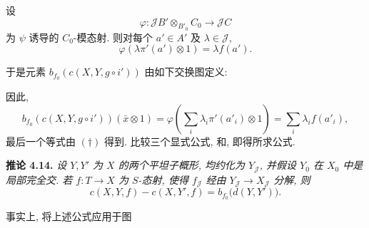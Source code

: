 \begin{center}
\end{center}

设
\[
 \varphi:\mathscr J B'\otimes_{B'_0}C_0\longrightarrow\mathscr J C
\]
为 \(\psi\) 诱导的 \(C_0\)-模态射. 则对每个
\(a'\in A'\) 及 \(\lambda\in\mathscr J\),
\begin{equation*}
\tag{\(\dagger\)}\label{sga3:iii:proposition:4-13:equation:dagger}
 \varphi(\lambda\pi'(a')\otimes1)=\lambda f(a').
\end{equation*}

于是元素 \(b_{f_0}(c(X,Y,g\circ i'))\) 由如下交换图定义:

\begin{center}
\end{center}

因此,
\begin{equation*}
 \tag{3}\label{sga3:iii:proposition:4-13:equation:3}
 b_{f_0}(c(X,Y,g\circ i'))(\bar x\otimes1)
 =\varphi\left(\sum_i\lambda_i\pi'(a'_i)\otimes1\right)
 =\sum_i\lambda_i f(a'_i),
\end{equation*}
最后一个等式由 \((\dagger)\) 得到.
比较三个显式公式,
 和,
即得所求公式.

\medskip
\noindent{}\textbf{推论 4.14.}
\textit{设 \(Y,Y'\) 为 \(X\) 的两个平坦子概形,
均约化为 \(Y_{\mathscr J}\), 并假设 \(Y_0\) 在 \(X_0\) 中是局部完全交.
若 \(f:T\to X\) 为 \(S\)-态射, 使得
\(f_{\mathscr J}\) 经由 \(Y_{\mathscr J}\to X_{\mathscr J}\) 分解, 则}
\[
 c(X,Y,f)-c(X,Y',f)=b_{f_0}\bigl(d(Y,Y')\bigr).
\]

事实上, 将上述公式应用于图

\begin{center}
\end{center}

